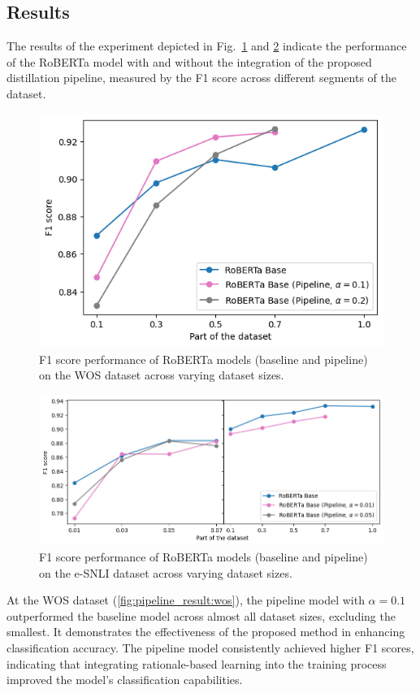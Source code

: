 \subsection*{Results}

The results of the experiment depicted in Fig.\ \ref{fig:pipeline_result:wos} and \ref{fig:pipeline_result:esnli} indicate the performance of the RoBERTa model with and without the integration of the proposed distillation pipeline, measured by the F1 score across different segments of the dataset.

\begin{figure}[p]
    \centering
    \includegraphics[width=0.63\linewidth]{figs/pipeline_wos.png}
    \caption{F1 score performance of RoBERTa models (baseline and pipeline) on the WOS dataset across varying dataset sizes.}
    \label{fig:pipeline_result:wos}
\end{figure}

\begin{figure}[p]
    \centering
    \includegraphics[width=\linewidth]{figs/pipeline_esnli.png}
    \caption{F1 score performance of RoBERTa models (baseline and pipeline) on the e-SNLI dataset across varying dataset sizes.}
    \label{fig:pipeline_result:esnli}
\end{figure}

At the WOS dataset (\autoref{fig:pipeline_result:wos}), the pipeline model with $\alpha = 0.1$ outperformed the baseline model across almost all dataset sizes, excluding the smallest. It demonstrates the effectiveness of the proposed method in enhancing classification accuracy. The pipeline model consistently achieved higher F1 scores, indicating that integrating rationale-based learning into the training process improved the model's classification capabilities.

